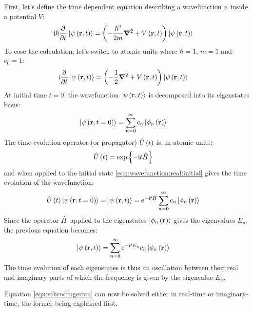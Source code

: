 First, let's define the time dependent \schrodinger equation describing a
wavefunction $\psi$ inside a potential $V$:
\begin{align}
\textrm{i} \hbar \frac{\partial^{{}}   }{\partial t^{{}}} \left| \psi\left( \textbf{r}, t \right) \right>
    & = \left( -\frac{\hbar^2}{2 m} \bm{\nabla}^2 + V\left( \textbf{r}, t \right)  \right) \left| \psi\left( \textbf{r},
t \right) \right>
\label{eqn:schrodinger:si}
\end{align}
To ease the calculation, let's switch to atomic units where $\hbar = 1$, $m
= 1$ and $e_0 = 1$:
\begin{align}
\textrm{i} \frac{\partial^{{}}   }{\partial t^{{}}} \left| \psi\left( \textbf{r}, t \right) \right>
    & = \left( -\frac{1}{2} \bm{\nabla}^2 + V\left( \textbf{r}, t \right)  \right) \left| \psi\left( \textbf{r}, t \right) \right>
\label{eqn:schrodinger:au}
\end{align}
At initial time $t = 0$, the wavefunction $\left| \psi\left( \textbf{r}, t \right) \right>$ is
decomposed into its eigenstates basis:
\begin{align}
\left| \psi\left( \textbf{r}, t=0 \right) \right> & = \sum_{n=0}^{\infty} c_n \left| \phi_n\left( \textbf{r} \right) \right>
\label{eqn:wavefunction:real:initial}
\end{align}
The time-evolution operator (or propagator) $\hat{U}\left( t \right)$ is, in atomic units:
\begin{align}
\hat{U}\left( t \right) & = \exp{ \left\{  - \textrm{i}t  \hat{H} \right\}}
\label{eqn:propagator:real}
\end{align}
and when applied to the initial state \eqref{eqn:wavefunction:real:initial}
gives the time evolution of the wavefunction:
\begin{align}
\hat{U}\left( t \right) \left| \psi\left( \textbf{r}, t=0 \right) \right>
    = \left| \psi\left( \textbf{r}, t \right) \right>
  & = \textrm{e}^{ - \textrm{i} t \hat{H} } \sum_{n=0}^{\infty} c_n \left| \phi_n\left( \textbf{r} \right) \right>
\end{align}
Since the operator $\hat{H}$ applied to the eigenstates
$\left| \phi_n\left( \textbf{r} \right) \right>$ gives the eigenvalues $E_n$, the previous equation
becomes:
\begin{align}
\left| \psi\left( \textbf{r}, t \right) \right>
 & = \sum_{n=0}^{\infty} \textrm{e}^{ - \textrm{i} t E_n } c_n \left| \phi_n\left( \textbf{r} \right) \right>
\label{eqn:wavefunction:eigenstates:time_evolution:real}
\end{align}
The time evolution of each eigenstates is thus an oscillation between their real
and imaginary parts of which the frequency is given by the eigenvalue $E_n$.



Equation \eqref{eqn:schrodinger:au} can now be solved either in real-time or
imaginary-time, the former being explained first.

